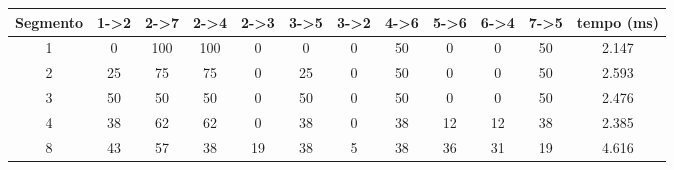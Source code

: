 \scalebox{0.65} {
\begin {tabular}{|c|c|c|c|c|c|c|c|c|c|c|c|}
\hline
Segmento & 1->2 & 2->7 & 2->4 & 2->3 & 3->5 & 3->2 & 4->6 & 5->6 & 6->4 & 7->5 & tempo (ms)\\ \hline
1 & 0 & 100 & 100 & 0 & 0 & 0 & 50 & 0 & 0 & 50 & 2.147\\ \hline
2 & 25 & 75 & 75 & 0 & 25 & 0 & 50 & 0 & 0 & 50 & 2.593\\ \hline
3 & 50 & 50 & 50 & 0 & 50 & 0 & 50 & 0 & 0 & 50 & 2.476\\ \hline
4 & 38 & 62 & 62 & 0 & 38 & 0 & 38 & 12 & 12 & 38 & 2.385\\ \hline
8 & 43 & 57 & 38 & 19 & 38 & 5 & 38 & 36 & 31 & 19 & 4.616\\ \hline

\end{tabular}
}
